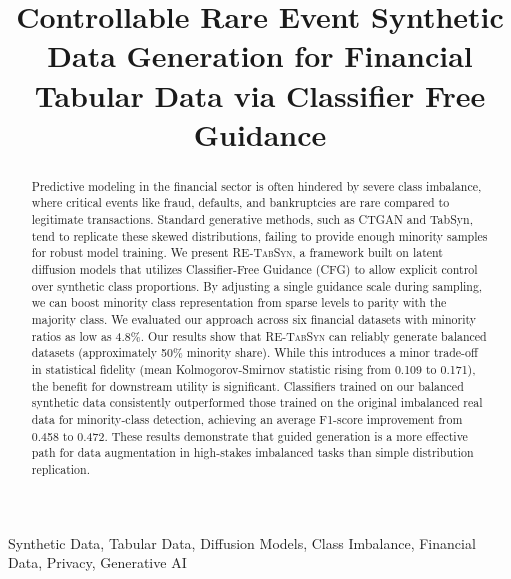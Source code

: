 \documentclass[conference]{IEEEtran}
\newcommand{\retabsyn}{\textsc{RE-TabSyn}}
\begin{document}
\title{Controllable Rare Event Synthetic Data Generation for Financial Tabular Data via Classifier Free Guidance}


\author{
}



\maketitle
\begin{abstract}
Predictive modeling in the financial sector is often hindered by severe class imbalance, where critical events like fraud, defaults, and bankruptcies are rare compared to legitimate transactions. Standard generative methods, such as CTGAN and TabSyn, tend to replicate these skewed distributions, failing to provide enough minority samples for robust model training. We present \retabsyn{}, a framework built on latent diffusion models that utilizes Classifier-Free Guidance (CFG) to allow explicit control over synthetic class proportions. By adjusting a single guidance scale during sampling, we can boost minority class representation from sparse levels to parity with the majority class. We evaluated our approach across six financial datasets with minority ratios as low as 4.8\%. Our results show that \retabsyn{} can reliably generate balanced datasets (approximately 50\% minority share). While this introduces a minor trade-off in statistical fidelity (mean Kolmogorov-Smirnov statistic rising from 0.109 to 0.171), the benefit for downstream utility is significant. Classifiers trained on our balanced synthetic data consistently outperformed those trained on the original imbalanced real data for minority-class detection, achieving an average F1-score improvement from 0.458 to 0.472. These results demonstrate that guided generation is a more effective path for data augmentation in high-stakes imbalanced tasks than simple distribution replication.
\end{abstract}
\begin{IEEEkeywords}
Synthetic Data, Tabular Data, Diffusion Models, Class Imbalance, Financial Data, Privacy, Generative AI
\end{IEEEkeywords}

\end{document}
